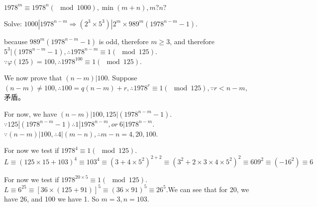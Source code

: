 \documentclass[UTF8]{../09-Mathematics}
\begin{document}
\begin{proposition}
    $1978^m \equiv 1978^n(\mod 1000), \min(m+n), m? n?$
    
    Solve: $1000 | 1978^{n-m} \Rightarrow  (2^3 \times 5^3) | 2^m \times 989^m (1978^{n-m}-1)$.

    because $989^m (1978^{n-m}-1)$ is odd, therefore $m \geqslant 3$, and therefore $5^3 | (1978^{n-m}-1), \therefore 1978^{n-m} \equiv 1 (\mod 125)$. $\because \varphi(125) = 100, \therefore 1978^{100}\equiv 1 (\mod 125)$.

    We now prove that $(n-m)|100$. Suppose $(n-m) \neq 100,  \therefore 100 = q(n-m) + r, \therefore 1978^{r}\equiv 1 (\mod 125), \because r < n-m$, 矛盾。

    For now, we have $(n-m)|100, 125 | (1978^{n-m}-1)$. $\because 125 | (1978^{n-m}-1) \therefore 1 | 1978^{n-m}, or \ 6 | 1978^{n-m}$. $\because (n-m)|100, \therefore 4 | (m-n), \therefore m-n = 4,20,100$. 

    For now we test if $1978^4 \equiv 1 (\mod 125)$.
    $L \equiv (125 \times 15 + 103)^4 
    \equiv 103^4 \equiv (3+4 \times 5^2)^{2+2} \equiv (3^2 + 2 \times 3 \times 4 \times 5^2)^2\equiv 609^2 \equiv (-16^2) \equiv 6$

    For now we test if $1978^{20 \times 5} \equiv 1 (\mod 125)$.
    $L \equiv 6^{25} \equiv [36 \times(125+91)]^5 \equiv (36 \times 91)^5 \equiv 26^5 $.We can see that for 20, we have 26, and 100 we have 1. So $m = 3, n = 103$.
\end{proposition}
\end{document}
